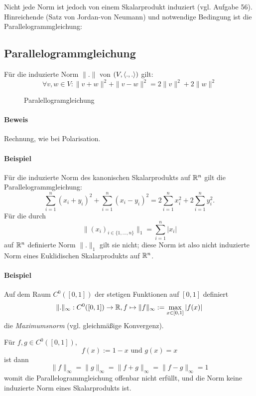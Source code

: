 	Nicht jede Norm ist jedoch von einem Skalarprodukt induziert (vgl. Aufgabe 56).
	Hinreichende (Satz von Jordan-von Neumann) und notwendige Bedingung ist die Parallelogrammgleichung:
	
\subsection{Parallelogrammgleichung}
\begin{Satz}[Parallelogrammgleichung]
	Für die induzierte Norm $ \|.\| $ von $ (V,\langle .,. \rangle) $ gilt:
		\[ \forall v,w\in V: \|v+w\|^2+\|v-w\|^2=2\|v\|^2+2\|w\|^2 \]
\end{Satz}		

 	\begin{figure}[h]\centering
 		
 		\caption{Paralellogramgleichung}
	\end{figure}\noindent
		
\paragraph{Beweis}
	Rechnung, wie bei Polarisation.
\paragraph{Beispiel}
	Für die induzierte Norm des kanonischen Skalarprodukts auf $ \mathbb{R}^n $ gilt die Parallelogrammgleichung:
		\[ \sum_{i=1}^{n}(x_i+y_i)^2 + \sum_{i=1}^{n}(x_i-y_i)^2 = 2\sum_{i=1}^{n}x_i^2+2\sum_{i=1}^{n}y_i^2. \]
	Für die durch
		\[ \|(x_i)_{i\in \{1,\dots,n\}}\|_1 = \sum_{i=1}^{n}|x_i| \]
	auf $ \mathbb{R}^n $ definierte Norm $ \|.\|_1 $ gilt sie nicht; diese Norm ist also nicht induzierte Norm eines Euklidischen Skalarprodukts auf $ \mathbb{R}^n $.
\paragraph{Beispiel}
	Auf dem Raum $ C^0([0,1]) $ der stetigen Funktionen auf $ [0,1] $ definiert
		\[ \|.\|_\infty: C^0([0,1]) \to \mathbb{R}, f\mapsto \|f\|_\infty := \max_{x\in [0,1]}|f(x)| \]
	die \emph{Maximumsnorm} (vgl. gleichmäßige Konvergenz).
	
	Für $ f,g\in C^0([0,1]) $,
		\[ f(x):= 1-x \text{ und } g(x) = x \]
	ist dann
		\[ \|f\|_\infty = \|g\|_\infty = \|f+g\|_\infty = \|f-g\|_\infty = 1 \]
	womit die Parallelogrammgleichung offenbar nicht erfüllt, und die Norm keine induzierte Norm eines Skalarprodukts ist.